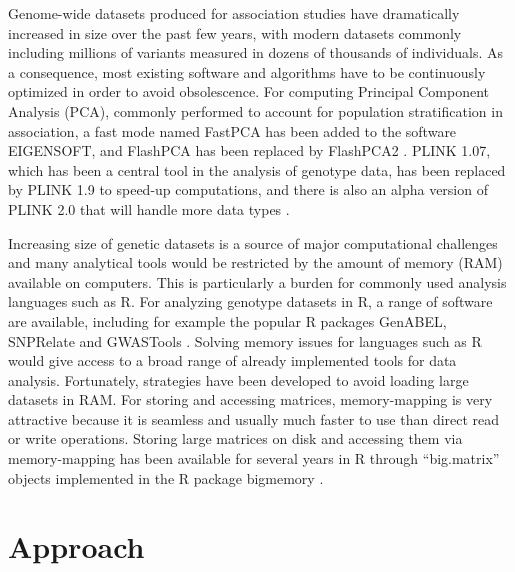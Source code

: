 \documentclass{bioinfo}
\begin{document}
{\color{red}
Genome-wide datasets produced for association studies have dramatically increased in size over the past few years, with modern datasets commonly including millions of variants measured in dozens of thousands of individuals.
As a consequence, most existing software and algorithms have to be continuously optimized in order to avoid obsolescence. For computing Principal Component Analysis (PCA), commonly performed to account for population stratification in association, a fast mode named FastPCA has been added to the software EIGENSOFT, and FlashPCA has been replaced by FlashPCA2 \cite[]{Abraham2014a,Abraham2016a,Galinsky2016,Price2006}. 
PLINK 1.07, which has been a central tool in the analysis of genotype data, has been replaced by PLINK 1.9 to speed-up computations, and there is also an alpha version of PLINK 2.0 that will handle more data types \cite[]{chang2015second,Purcell2007}. 

Increasing size of genetic datasets is a source of major computational challenges and many analytical tools would be restricted by the amount of memory (RAM) available on computers.
This is particularly a burden for commonly used analysis languages such as R.
For analyzing genotype datasets in R, a range of software are available, including for example the popular R packages GenABEL, SNPRelate and GWASTools \cite[]{aulchenko2007genabel,Gogarten2012,zheng2012high}. 
Solving memory issues for languages such as R would give access to a broad range of already implemented tools for data analysis. Fortunately, strategies have been developed to avoid loading large datasets in RAM. For storing and accessing matrices, memory-mapping is very attractive because it is seamless and usually much faster to use than direct read or write operations. Storing large matrices on disk and accessing them via memory-mapping has been available for several years in R through ``big.matrix'' objects implemented in the R package bigmemory \cite[]{Kane2013}.
}

\section{Approach}
\end{document}
